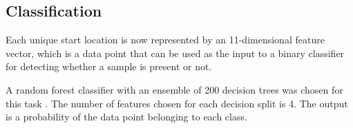 \documentclass{article}
\begin{document}



\subsection{Classification}
\label{class}
Each unique start location is now represented by an 11-dimensional feature vector, which is a data point that can be used as the input to a binary classifier for detecting whether a sample is present or not.

A random forest classifier with an ensemble of 200 decision trees was chosen for this task \cite{breiman2001random}. The number of features chosen for each decision split is 4. The output is a probability of the data point belonging to each class.
\end{document}
